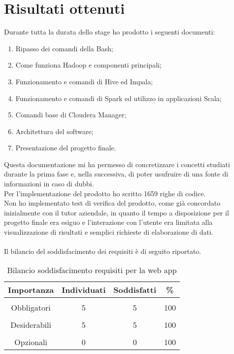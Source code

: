 \newpage
\section{Risultati ottenuti}
Durante tutta la durata dello stage ho prodotto i seguenti documenti:
\begin{enumerate}
	\item Ripasso dei comandi della \gls{Bash};
	\item Come funziona Hadoop e componenti principali;
	\item Funzionamento e comandi di Hive ed Impala;
	\item Funzionamento e comandi di Spark ed utilizzo in applicazioni Scala;
	\item Comandi base di Cloudera Manager;
	\item Architettura del software;
	\item Presentazione del progetto finale.
\end{enumerate}
Questa documentazione mi ha permesso di concretizzare i concetti studiati durante la prima fase e, nella successiva, di poter usufruire di una fonte di informazioni in caso di dubbi.\\
Per l'implementazione del prodotto ho scritto 1659 righe di codice.\\
Non ho implementato test di verifica del prodotto, come già concordato inizialmente con il tutor aziendale, in quanto il tempo a disposizione per il progetto finale era esiguo e l'interazione con l'utente era limitata alla visualizzazione di risultati e semplici richieste di elaborazione di dati.\\\\
Il bilancio del soddisfacimento dei requisiti è di seguito riportato.\\

\begin{table}[!h] %
	\caption{Bilancio soddisfacimento requisiti per la web app}
	\label{tab:bilancio-app}
	\centering
	\begin{tabular}{ c | c | c | c}
		\textbf{Importanza} & \textbf{Individuati} & \textbf{Soddisfatti} & \textbf{\%}\\
		\hline
		\hline
		\\[-2.5mm]
		Obbligatori & 5 & 5 & 100 \\
		\hline
		\\[-2.5mm]
		Desiderabili & 5 & 5 & 100 \\
		\hline
		\\[-2.5mm]
		Opzionali & 0 & 0 & 100 \\
		\hline
	\end{tabular}
\end{table}%